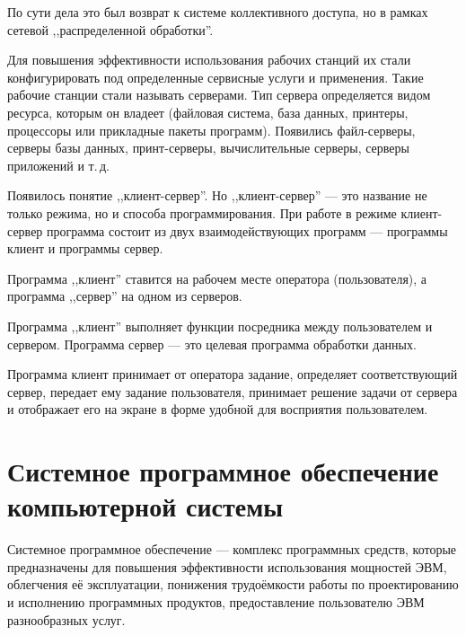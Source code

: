 \documentclass[a4paper, 10pt, notitlepage, pdftex,headsepline]{scrartcl}
\begin{document}
    По сути дела это был возврат к системе коллективного доступа, но в
    рамках сетевой ,,распределенной обработки''.

    Для повышения эффективности использования рабочих станций их стали
    конфигурировать под определенные сервисные услуги и применения.
    Такие рабочие станции стали называть серверами.
    Тип сервера определяется видом ресурса, которым он владеет (файловая
    система, база данных, принтеры, процессоры или прикладные пакеты программ).
    Появились файл-серверы, серверы базы данных, принт-серверы,
    вычислительные серверы, серверы приложений и т.\,д.

    Появилось понятие ,,клиент-сервер''. Но ,,клиент-сервер'' --- это
    название не только режима, но и способа программирования.
    При работе в режиме клиент-сервер программа состоит из двух
    взаимодействующих программ --- программы клиент и программы сервер.

    Программа ,,клиент'' ставится на рабочем месте оператора
    (пользователя), а программа ,,сервер'' на одном из серверов.

    Программа ,,клиент'' выполняет функции посредника между пользователем и сервером.
    Программа сервер --- это целевая программа обработки данных.

    Программа клиент принимает от оператора задание, определяет
    соответствующий сервер, передает ему задание пользователя, принимает
    решение задачи от сервера и отображает его на экране в форме удобной
    для восприятия пользователем.
\section{Системное программное обеспечение компьютерной системы}
  Системное программное обеспечение --- комплекс программных средств,
  которые предназначены для повышения эффективности использования
  мощностей ЭВМ, облегчения её эксплуатации, понижения трудоёмкости
  работы по проектированию и исполнению программных продуктов,
  предоставление пользователю ЭВМ разнообразных услуг.
\end{document}
